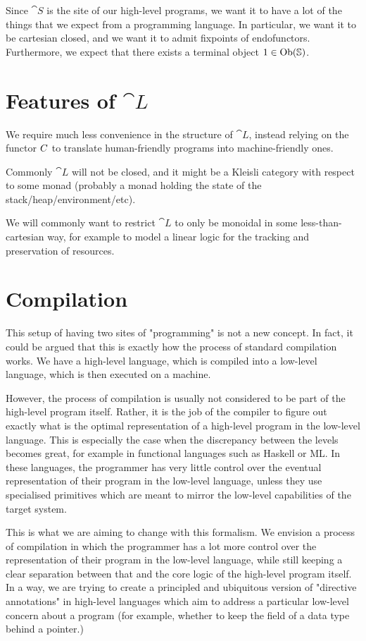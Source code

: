 Since $\cat S$ is the site of our high-level programs, we want it to have a lot
of the things that we expect from a programming language. In particular, we
want it to be cartesian closed, and we want it to admit fixpoints of
endofunctors. Furthermore, we expect that there exists a terminal object $1 \in
  \mathrm{Ob}(\mathbb S)$.

\section{Features of $\cat L$}

We require much less convenience in the structure of $\cat L$, instead relying
on the functor $ C$ to translate human-friendly programs into
machine-friendly ones.

Commonly $\cat L$ will not be closed, and it might be a Kleisli category with
respect to some monad (probably a monad holding the state of the
stack/heap/environment/etc).

We will commonly want to restrict $\cat L$ to only be monoidal in some
less-than-cartesian way, for example to model a linear logic for the tracking
and preservation of resources.

\section{Compilation}

This setup of having two sites of "programming" is not a new concept. In fact,
it could be argued that this is exactly how the process of standard compilation
works. We have a high-level language, which is compiled into a low-level
language, which is then executed on a machine.

However, the process of compilation is usually not considered to be part of the
high-level program itself. Rather, it is the job of the compiler to figure out
exactly what is the optimal representation of a high-level program in the
low-level language. This is especially the case when the discrepancy between
the levels becomes great, for example in functional languages such as Haskell
or ML. In these languages, the programmer has very little control over the
eventual representation of their program in the low-level language, unless they
use specialised primitives which are meant to mirror the low-level capabilities
of the target system.

This is what we are aiming to change with this formalism. We envision a process
of compilation in which the programmer has a lot more control over the
representation of their program in the low-level language, while still keeping
a clear separation between that and the core logic of the high-level program
itself. In a way, we are trying to create a principled and ubiquitous version
of "directive annotations" in high-level languages which aim to address a
particular low-level concern about a program (for example, whether to keep the
field of a data type behind a pointer.)

